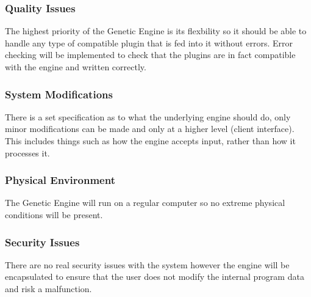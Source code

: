 \subsubsection{Quality Issues}
The highest priority of the Genetic Engine is its flexbility so it should be able to handle any type of compatible plugin that is fed into it without errors. Error checking will be implemented to check that the plugins are in fact compatible with the engine and written correctly. 

\subsubsection{System Modifications}
There is a set specification as to what the underlying engine should do, only minor modifications can be made and only at a higher level (client interface). This includes things such as how the engine accepts input, rather than how it processes it.

\subsubsection{Physical Environment}
The Genetic Engine will run on a regular computer so no extreme physical conditions will be present.

\subsubsection{Security Issues}
There are no real security issues with the system however the engine will be encapsulated to ensure that the user does not modify the internal program data and risk a malfunction.

